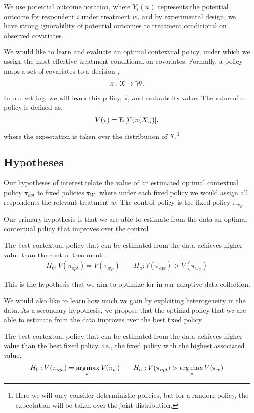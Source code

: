 \documentclass[letterpaper, 12pt, parskip=full,]{scrartcl}
\begin{document}
We use potential outcome notation, where $Y_i(w)$ represents the potential outcome for respondent $i$ under treatment $w$, and by experimental design,  we have strong ignorability of potential outcomes to treatment conditional on observed covariates. 


We would like to learn and evaluate an optimal contextual policy, under which we assign the most effective treatment conditional on covariates. Formally, a policy maps a set of covariates to a decision \citep{athey2017efficient}, 
\begin{align}
  \pi: {\EuScript X} \rightarrow {\EuScript W}. 
  \label{eq:policy}
\end{align}
In our setting, we will learn this policy, $\hat \pi$, and evaluate its value. The value of a policy is defined as, 
\begin{align}
V(\pi) =  {\textrm E}\,[Y(\pi(X_{i}))],
  \label{eq:policy_value}
\end{align}
where the expectation is taken over the distribution of $X$.\footnote{Here we will only consider deterministic policies, but for a random policy, the expectation will be taken over the joint distribution. }

\subsection{Hypotheses}\label{hypotheses}

Our hypotheses of interest relate the value of an estimated optimal contextual policy $\pi_{opt}$ to fixed policies $\pi_{W}$, where under each fixed policy we would assign all respondents the relevant treatment $w$. The control policy is the fixed policy $\pi_{w_{C}}$

Our primary hypothesis is that we are able to estimate from the data an optimal contextual policy that improves over the control. 
  \begin{hypothesis}
  The best contextual policy that can be estimated from the data achieves higher value than the control treatment \label{eq:optctr}.
\begin{align}
  H_{0}: V(\pi_{opt}) = V(\pi_{w_{C}}) \qquad H_{a}:  V(\pi_{opt}) > V(\pi_{w_{C}})
\end{align}
\end{hypothesis}
This is the hypothesis that we aim to optimize for in our adaptive data collection. 

We would also like to learn how much we gain by exploiting heterogeneity in the data. As a secondary hypothesis, we propose that the optimal policy that we are able to estimate from the data improves over the best fixed policy. 
  \begin{hypothesis}
  The best contextual policy that can be estimated from the data achieves higher value than the best fixed policy, i.e., the fixed policy with the highest associated value. 
  \label{eq:optmax}
\begin{align}
  H_{0}: V(\pi_{opt}) = \operatorname*{arg\,max}_w V(\pi_{w}) \qquad H_{a}:  V(\pi_{opt}) > \operatorname*{arg\,max}_w V(\pi_{w})
\end{align}
\end{hypothesis}
\end{document}
